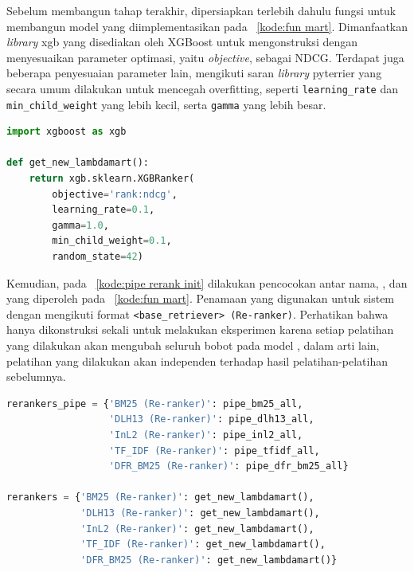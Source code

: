 Sebelum membangun \pipeline{} tahap \ranking{} terakhir, dipersiapkan terlebih dahulu fungsi untuk membangun model \lambdamart{} yang diimplementasikan pada \kode{}~\ref{kode:fun mart}. Dimanfaatkan \textit{library} xgb yang disediakan oleh XGBoost untuk mengonstruksi \lambdamart{} dengan menyesuaikan parameter optimasi, yaitu \textit{objective}, sebagai NDCG. Terdapat juga beberapa penyesuaian parameter lain, mengikuti saran \textit{library} pyterrier yang secara umum dilakukan untuk mencegah overfitting, seperti \lstinline{learning_rate} dan \lstinline{min_child_weight} yang lebih kecil, serta \lstinline{gamma} yang lebih besar.
\begin{lstlisting}[language=Python, caption={Pembentukan model \lambdamart{}}, label={kode:fun mart}]
import xgboost as xgb

def get_new_lambdamart():
    return xgb.sklearn.XGBRanker(
        objective='rank:ndcg',
        learning_rate=0.1,
        gamma=1.0,
        min_child_weight=0.1,
        random_state=42)
\end{lstlisting}

Kemudian, pada \kode{}~\ref{kode:pipe rerank init} dilakukan pencocokan antar nama, \pipeline{}, dan \reranker{} \lambdamart{} yang diperoleh pada \kode{}~\ref{kode:fun mart}. Penamaan yang digunakan untuk sistem \ir{} dengan \reranker{} mengikuti format \lstinline{<base_retriever> (Re-ranker)}. Perhatikan bahwa \lambdamart{} hanya dikonstruksi sekali untuk melakukan eksperimen karena setiap pelatihan yang dilakukan akan mengubah seluruh bobot pada model \lambdamart{}, dalam arti lain, pelatihan yang dilakukan akan independen terhadap hasil pelatihan-pelatihan sebelumnya.
\begin{lstlisting}[language=Python, caption={Pencocokan \pipeline{} \reranker{}}, label={kode:pipe rerank init}]
rerankers_pipe = {'BM25 (Re-ranker)': pipe_bm25_all,
                  'DLH13 (Re-ranker)': pipe_dlh13_all,
                  'InL2 (Re-ranker)': pipe_inl2_all,
                  'TF_IDF (Re-ranker)': pipe_tfidf_all,
                  'DFR_BM25 (Re-ranker)': pipe_dfr_bm25_all}

rerankers = {'BM25 (Re-ranker)': get_new_lambdamart(),
             'DLH13 (Re-ranker)': get_new_lambdamart(),
             'InL2 (Re-ranker)': get_new_lambdamart(),
             'TF_IDF (Re-ranker)': get_new_lambdamart(),
             'DFR_BM25 (Re-ranker)': get_new_lambdamart()}
\end{lstlisting}

